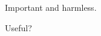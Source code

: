 \begin{tdocimp}
    Important and harmless.
\end{tdocimp}

\begin{tdocimp}
    Useful?
\end{tdocimp}
